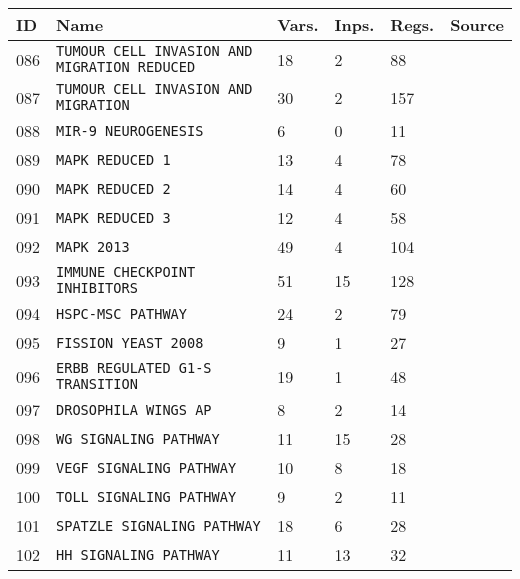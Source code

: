 \documentclass{article}
\begin{document}
\begin{center}
	\begin{tabular}{ | C{16pt} | C{149pt} | C{25pt} | C{25pt} | C{25pt} | C{35pt} | }
		\hline
		ID & Name & Vars. & Inps. & Regs. & Source \\ 
		 & \texttt{TUMOUR CELL INVASION AND MIGRATION REDUCED} & 18 & 2 & 88 & \cite{bbm-086-087, ginsim} \\
		 & \texttt{TUMOUR CELL INVASION AND MIGRATION} & 30 & 2 & 157 & \cite{bbm-086-087, ginsim} \\
		 & \texttt{MIR-9 NEUROGENESIS} & 6 & 0 & 11 & \cite{bbm-088, ginsim} \\
		 & \texttt{MAPK REDUCED 1} & 13 & 4 & 78 & \cite{bbm-089-090-091-092, ginsim} \\
		 & \texttt{MAPK REDUCED 2} & 14 & 4 & 60 & \cite{bbm-089-090-091-092, ginsim} \\
		 & \texttt{MAPK REDUCED 3} & 12 & 4 & 58 & \cite{bbm-089-090-091-092, ginsim} \\
		 & \texttt{MAPK 2013} & 49 & 4 & 104 & \cite{bbm-089-090-091-092, ginsim} \\
		 & \texttt{IMMUNE CHECKPOINT INHIBITORS} & 51 & 15 & 128 & \cite{bbm-093, ginsim} \\
		 & \texttt{HSPC-MSC PATHWAY} & 24 & 2 & 79 & \cite{bbm-094, ginsim} \\
		 & \texttt{FISSION YEAST 2008} & 9 & 1 & 27 & \cite{bbm-095, ginsim} \\
		 & \texttt{ERBB REGULATED G1-S TRANSITION} & 19 & 1 & 48 & \cite{bbm-096, ginsim} \\
		 & \texttt{DROSOPHILA WINGS AP} & 8 & 2 & 14 & \cite{bbm-097, ginsim} \\
		 & \texttt{WG SIGNALING PATHWAY} & 11 & 15 & 28 & \cite{bbm-098-099-100-101-102-103, ginsim} \\
		 & \texttt{VEGF SIGNALING PATHWAY} & 10 & 8 & 18 & \cite{bbm-098-099-100-101-102-103, ginsim} \\
		 & \texttt{TOLL SIGNALING PATHWAY} & 9 & 2 & 11 & \cite{bbm-098-099-100-101-102-103, ginsim} \\
		 & \texttt{SPATZLE SIGNALING PATHWAY} & 18 & 6 & 28 & \cite{bbm-098-099-100-101-102-103, ginsim} \\
		 & \texttt{HH SIGNALING PATHWAY} & 11 & 13 & 32 & \cite{bbm-098-099-100-101-102-103, ginsim} \\
		\hline

\end{tabular}
\end{center}
\end{document}

